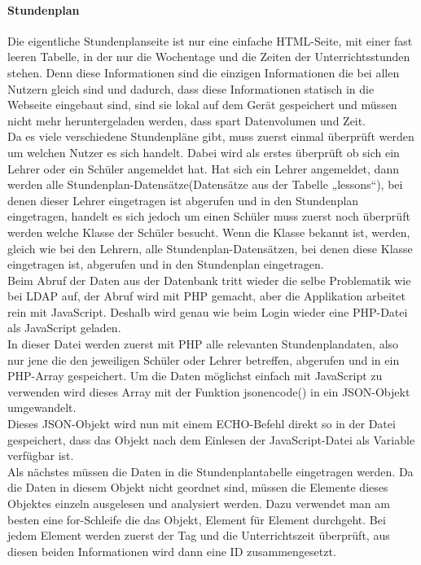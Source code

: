 \paragraph{Stundenplan\\}
Die eigentliche Stundenplanseite ist nur eine einfache HTML-Seite, mit einer fast leeren Tabelle, in der nur die Wochentage und die Zeiten der Unterrichtsstunden stehen. Denn diese Informationen sind die einzigen Informationen die bei allen Nutzern gleich sind und dadurch, dass diese Informationen statisch in die Webseite eingebaut sind, sind sie lokal auf dem Gerät gespeichert und müssen nicht mehr heruntergeladen werden, dass spart Datenvolumen und Zeit.\\
Da es viele verschiedene Stundenpläne gibt, muss zuerst einmal überprüft werden um welchen Nutzer es sich handelt. Dabei wird als erstes überprüft ob sich ein Lehrer oder ein Schüler angemeldet hat. Hat sich ein Lehrer angemeldet, dann werden alle Stundenplan-Datensätze(Datensätze aus der Tabelle „lessons“), bei denen dieser Lehrer eingetragen ist abgerufen und in den Stundenplan eingetragen, handelt es sich jedoch um einen Schüler muss zuerst noch überprüft werden welche Klasse der Schüler besucht. Wenn die Klasse bekannt ist, werden, gleich wie bei den Lehrern, alle Stundenplan-Datensätzen, bei denen diese Klasse eingetragen ist, abgerufen und in den Stundenplan eingetragen.\\
Beim Abruf der Daten aus der Datenbank tritt wieder die selbe Problematik wie bei LDAP auf, der Abruf wird mit PHP gemacht, aber die Applikation arbeitet rein mit JavaScript. Deshalb wird genau wie beim Login wieder eine PHP-Datei als JavaScript geladen.\\
In dieser Datei werden zuerst mit PHP alle relevanten Stundenplandaten, also nur jene die den jeweiligen Schüler oder Lehrer betreffen, abgerufen und in ein PHP-Array gespeichert. Um die Daten möglichst einfach mit JavaScript zu verwenden wird dieses Array mit der Funktion jsonencode() in ein JSON-Objekt umgewandelt.\\
Dieses JSON-Objekt wird nun mit einem ECHO-Befehl direkt so in der Datei gespeichert, dass das Objekt nach dem Einlesen der JavaScript-Datei als Variable verfügbar ist.\\
Als nächstes müssen die Daten in die Stundenplantabelle eingetragen werden. Da die Daten in diesem Objekt nicht geordnet sind, müssen die Elemente dieses Objektes einzeln ausgelesen und analysiert werden. Dazu verwendet man am besten eine for-Schleife die das Objekt, Element für Element durchgeht. Bei jedem Element werden zuerst der Tag und die Unterrichtszeit überprüft, aus diesen beiden Informationen wird dann eine ID zusammengesetzt.\\
